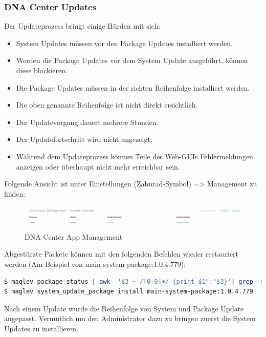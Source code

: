 \subsubsection{DNA Center Updates}
Der Updateprozess bringt einige Hürden mit sich:
\begin{itemize}
	\item System Updates müssen vor den Package Updates installiert werden.
	\item Werden die Package Updates vor dem System Update ausgeführt, können diese blockieren. 
	\item Die Package Updates müssen in der richten Reihenfolge installiert werden.
	\item Die oben genannte Reihenfolge ist nicht direkt ersichtlich.
	\item Der Updatevorgang dauert mehrere Stunden.
	\item Der Updatefortschritt wird nicht angezeigt. 
	\item Während dem Updateprozess können Teile des Web-GUIs Fehlermeldungen anzeigen oder überhaupt nicht mehr erreichbar sein.
\end{itemize}

Folgende Ansicht ist unter Einstellungen (Zahnrad-Symbol) => Management zu finden:

\begin{figure}[H]
	\centering
	\includegraphics[width=\columnwidth]{img/sc_009.png}
	\caption{DNA Center App Management}
	\label{fig:dna-center-gui-update-1}
\end{figure}

Abgestürzte Packete können mit den folgenden Befehlen wieder restauriert werden (Am Beispiel von main-system-package:1.0.4.779):

\begin{lstlisting}[language=bash]
$ maglev package status | awk  '$3 ~ /[0-9]+/ {print $1":"$3}'| grep -v "^system" |  while read pkg; do maglev catalog package delete $pkg;done
$ maglev system_update_package install main-system-package:1.0.4.779
\end{lstlisting}

Nach einem Update wurde die Reihenfolge von System und Package Update angepasst. Vermutlich um den Administrator dazu zu bringen zuerst die System Updates zu installieren. 

